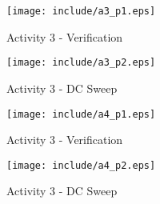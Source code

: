 \begin{figure}[H]
	\centering
	\texttt{[image: include/a3\_p1.eps]}
	\caption{Activity 3 - Verification}
	\label{fig:a3-p1}
\end{figure}
\begin{framed}
	
\end{framed}

\begin{figure}[H]
	\centering
	\texttt{[image: include/a3\_p2.eps]}
	\caption{Activity 3 - DC Sweep}
	\label{fig:a3-p2}
\end{figure}
\begin{framed}
	
\end{framed}




\begin{figure}[H]
	\centering
	\texttt{[image: include/a4\_p1.eps]}
	\caption{Activity 3 - Verification}
	\label{fig:a4-p1}
\end{figure}
\begin{framed}
	
\end{framed}

\begin{figure}[H]
	\centering
	\texttt{[image: include/a4\_p2.eps]}
	\caption{Activity 3 - DC Sweep}
	\label{fig:a4-p2}
\end{figure}
\begin{framed}
	
\end{framed}
